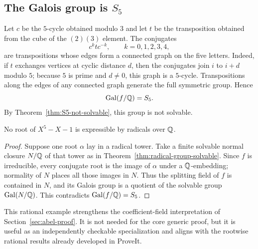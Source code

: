 \subsection{The Galois group is \texorpdfstring{$S_5$}{S5}}

Let $c$ be the $5$-cycle obtained modulo $3$ and let $t$ be the transposition
obtained from the cube of the $(2)(3)$ element.  The conjugates
\[
 c^k t c^{-k},\qquad k=0,1,2,3,4,
\]
are transpositions whose edges form a connected graph on the five letters.
Indeed, if $t$ exchanges vertices at cyclic distance $d$, then the conjugates
join $i$ to $i+d$ modulo $5$; because $5$ is prime and $d\ne0$, this graph is
a $5$-cycle.  Transpositions along the edges of any connected graph generate
the full symmetric group.  Hence
\[
 \operatorname{Gal}(f/\mathbb Q)=S_5.
\]
By Theorem~\ref{thm:S5-not-solvable}, this group is not solvable.

\begin{corollary}
No root of $X^5-X-1$ is expressible by radicals over $\mathbb Q$.
\end{corollary}

\begin{proof}
Suppose one root $\alpha$ lay in a radical tower.  Take a finite solvable
normal closure $N/\mathbb Q$ of that tower as in
Theorem~\ref{thm:radical-group-solvable}.  Since $f$ is irreducible, every
conjugate root is the image of $\alpha$ under a $\mathbb Q$-embedding; normality of
$N$ places all those images in $N$.  Thus the splitting field of $f$ is
contained in $N$, and its Galois group is a quotient of the solvable group
$\operatorname{Gal}(N/\mathbb Q)$.  This contradicts $\operatorname{Gal}(f/\mathbb Q)=S_5$.
\end{proof}

This rational example strengthens the coefficient-field interpretation of
Section~\ref{sec:abel-proof}.  It is not needed for the core generic proof, but
it is useful as an independently checkable specialization and aligns with the
rootwise rational results already developed in ProveIt.
